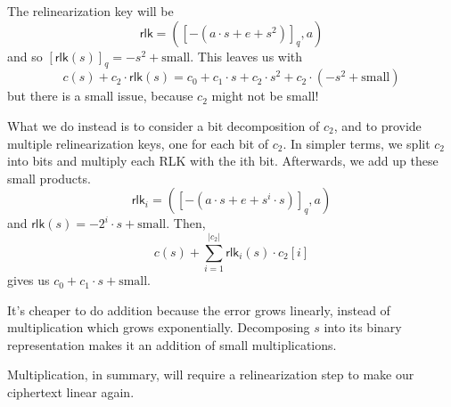 The relinearization key will be
\[\mathsf{rlk} = \left( [-(a\cdot s + e + s^2)]_q, a \right)\]
and so $[\mathsf{rlk}(s)]_q = -s^2 + \text{small}$. This leaves us with
\[c(s) + c_2 \cdot \mathsf{rlk}(s) = c_0 + c_1\cdot s + c_2\cdot s^2 + c_2\cdot (-s^2 + \text{small})\]
but there is a small issue, because $c_2$ might not be small!

What we do instead is to consider a bit decomposition of $c_2$, and to provide multiple relinearization keys, one for each bit of $c_2$. In simpler terms, we split $c_2$ into bits and multiply each RLK with the ith bit. Afterwards, we add up these small products.
\[\mathsf{rlk}_i = ([-(a\cdot s + e + s^i\cdot s)]_q, a)\]
and $\mathsf{rlk}(s) = -2^i\cdot s + \text{small}$. Then,
\[c(s) + \sum^{|c_2|}_{i=1}\mathsf{rlk}_i(s)\cdot c_2[i]\]
gives us $c_0 + c_1\cdot s + \text{small}$.

It's cheaper to do addition because the error grows linearly, instead of multiplication which grows exponentially. Decomposing $s$ into its binary representation makes it an addition of small multiplications.

Multiplication, in summary, will require a relinearization step to make our ciphertext linear again.






